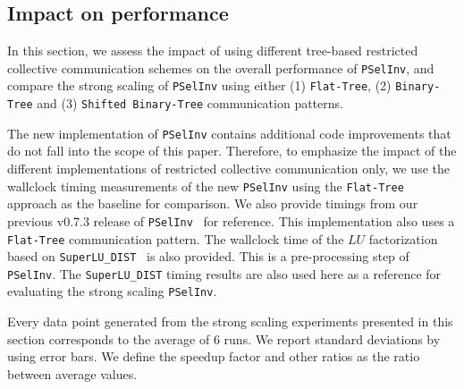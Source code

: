 \documentclass{acm_proc_article-sp}
\newcommand{\pselinv}{\texttt{PSelInv}\xspace}
\newcommand{\superlu}{\texttt{SuperLU\_DIST}\xspace}
\newcommand{\flattree}{\texttt{Flat-Tree}\xspace}
\newcommand{\btree}{\texttt{Binary-Tree}\xspace}
\newcommand{\modbtree}{\texttt{Shifted Binary-Tree}\xspace}
\begin{document}
\subsection{Impact on performance}

In this section, we assess the impact of using different tree-based 
restricted collective communication schemes on the overall 
performance of \pselinv, and compare the strong scaling of 
\pselinv using either (1) \flattree,
(2) \btree
and (3) \modbtree communication patterns. 



The new implementation of \pselinv contains additional code
improvements that do not fall into the scope of this paper. Therefore,
to emphasize the impact of the different implementations of 
restricted collective communication only, we use the wallclock timing 
measurements of the new \pselinv using the \flattree approach
as the baseline for comparison.
We also provide timings from our previous v0.7.3 release of
\pselinv~\cite{JacquelinLinYang2014} for reference.
This implementation also uses a \flattree communication pattern. 
The wallclock time of the $LU$ factorization based on
\superlu~\cite{LiDemmel2003} is also provided. This is a pre-processing
step of \pselinv. The \superlu timing results are also used here as a
reference for evaluating the strong scaling \pselinv.

Every data point generated from the strong scaling experiments presented 
in this section corresponds to the average of 6 runs.
We report standard deviations by using error bars. We define 
the speedup factor and other ratios as the ratio between average values.

\begin{figure*}[htbp]
\centering
{}



\caption{Running times of \pselinv for two sample matrices }
\end{figure*}
\end{document}
